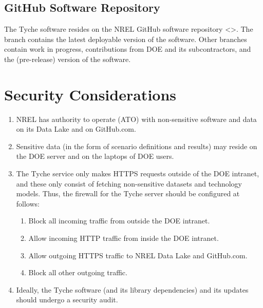 \documentclass[letterpaper,10pt,english]{sphinxmanual}
\begin{document}
\subsection{GitHub Software Repository}
\label{\detokenize{doc-src/deployment:github-software-repository}}
The Tyche software resides on the NREL GitHub software repository
\textless{}\textgreater{}. The  branch contains the
latest deployable version of the software. Other branches contain work
in progress, contributions from DOE and its subcontractors, and the
 (pre-release) version of the software.


\section{Security Considerations}
\label{\detokenize{doc-src/deployment:security-considerations}}\begin{enumerate}
\def\theenumi{\arabic{enumi}}
\def\labelenumi{\theenumi .}
\makeatletter\def\p@enumii{\p@enumi \theenumi .}\makeatother
\item {} 
NREL has authority to operate (ATO) with non-sensitive software and
data on its Data Lake and on GitHub.com.

\item {} 
Sensitive data (in the form of scenario definitions and results) may
reside on the DOE server and on the laptops of DOE users.

\item {} 
The Tyche service only makes HTTPS  requests outside of the
DOE intranet, and these only consist of fetching non-sensitive
datasets and technology models. Thus, the firewall for the Tyche
server should be configured at follows:
\begin{enumerate}
\def\theenumii{\arabic{enumii}}
\def\labelenumii{\theenumii .}
\makeatletter\def\p@enumiii{\p@enumii \theenumii .}\makeatother
\item {} 
Block all incoming traffic from outside the DOE intranet.

\item {} 
Allow incoming HTTP traffic from inside the DOE intranet.

\item {} 
Allow outgoing HTTPS traffic to NREL Data Lake and GitHub.com.

\item {} 
Block all other outgoing traffic.

\end{enumerate}

\item {} 
Ideally, the Tyche software (and its library dependencies) and its
updates should undergo a security audit.

\end{enumerate}
\end{document}
